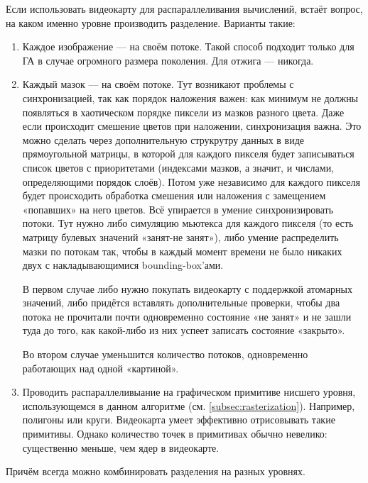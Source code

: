\documentclass[11pt]{article}
\begin{document}
\begin{itemize}
                Если использовать видеокарту для распараллеливания вычислений, встаёт вопрос, на каком именно уровне производить разделение.
                Варианты такие:
                \begin{enumerate}
                    \item Каждое изображение — на своём потоке.
                    Такой способ подходит только для ГА в случае огромного размера поколения. Для отжига — никогда.
                    \item Каждый мазок — на своём потоке.
                    Тут возникают проблемы с синхронизацией, так как порядок наложения важен: как минимум не должны появляться в хаотическом порядке пиксели из мазков разного цвета.
                    Даже если происходит смешение цветов при наложении, синхронизация важна.
                    Это можно сделать через дополнительную струкрутру данных в виде прямоугольной матрицы, в которой для каждого пикселя будет записываться список цветов с приоритетами
                    (индексами мазков, а значит, и числами, определяющими порядок слоёв).
                    Потом уже независимо для каждого пикселя будет происходить обработка смешения или наложения с замещением «попавших» на него цветов.
                    Всё упирается в умение синхронизировать потоки.
                    Тут нужно либо симуляцию мьютекса для каждого пикселя (то есть матрицу булевых значений «занят-не занят»),
                    либо умение распределить мазки по потокам так, чтобы в каждый момент времени не было никаких двух с накладывающимися bounding-box'ами.

                    В первом случае либо нужно покупать видеокарту с поддержкой атомарных значений, либо придётся вставлять дополнительные проверки,
                    чтобы два потока не прочитали почти одновременно состояние «не занят»  и не зашли туда до того, как какой-либо из них успеет записать состояние «закрыто».

                    Во втором случае уменьшится количество потоков, одновременно работающих над одной «картиной».
                    \item Проводить распараллеливыание на графическом примитиве нисшего уровня, использующемся в данном алгоритме (см. \ref{subsec:rasterization}).
                    Например, полигоны или круги.
                    Видеокарта умеет эффективно отрисовывать такие примитивы.
                    Однако количество точек в примитивах обычно невелико: существенно меньше, чем ядер в видеокарте.
                \end{enumerate}
                Причём всегда можно комбинировать разделения на разных уровнях.


\end{itemize}
\end{document}
